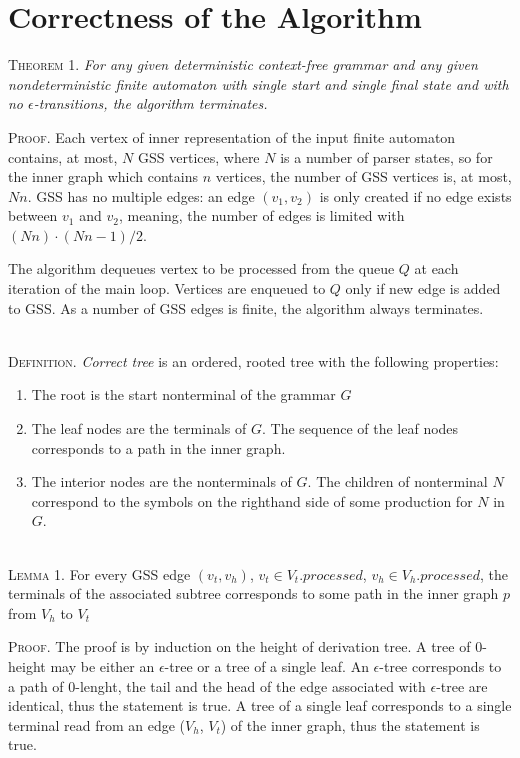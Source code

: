 \section{Correctness of the Algorithm}
\textsc{Theorem 1.}
\textit{For any given deterministic context-free grammar and any given nondeterministic
finite automaton with single start and single final state and with no $\epsilon$-transitions,
the algorithm terminates.}

\textsc{Proof.}
Each vertex of inner representation of the input finite automaton contains, at most, 
$N$ GSS vertices, where $N$ is a number of parser states, so for the inner graph which contains $n$
vertices, the number of GSS vertices is, at most, $Nn$. GSS has no multiple edges:
an edge $(v_{1}, v_{2})$ is only created if no edge exists between $v_{1}$ and $v_{2}$,  
meaning, the number of edges is limited with $(Nn) \cdot (Nn - 1) / 2 $. 

The algorithm dequeues vertex to be processed from the queue $Q$ at each iteration of the 
main loop. Vertices are enqueued to $Q$ only if new edge is added to GSS. As a number of 
GSS edges is finite, the algorithm always terminates. 

~\\
\textsc{Definition.} 
\emph{Correct tree} is an ordered, rooted tree with the following properties:
\begin{enumerate}
  \item The root is the start nonterminal of the grammar $G$
  \item The leaf nodes are the terminals of $G$. The sequence of the leaf nodes 
        corresponds to a path in the inner graph. 
  \item The interior nodes are the nonterminals of $G$. The children of nonterminal 
        $N$ correspond to the symbols on the righthand side of some production for $N$ in $G$.
\end{enumerate}

~\\
\textsc{Lemma 1.}
For every GSS edge $(v_{t}, v_{h})$, $v_{t} \in V_{t}.processed$, $v_{h} \in V_{h}.processed$, 
the terminals of the associated subtree corresponds to some path in the inner graph $p$ from $V_{h}$ to $V_{t}$

\textsc{Proof.}
The proof is by induction on the height of derivation tree. 
A tree of 0-height may be either an $\epsilon$-tree or a tree of a single leaf.
An $\epsilon$-tree corresponds to a path of 0-lenght, the tail and the head of the edge associated with 
$\epsilon$-tree are identical, thus the statement is true. A tree of a single leaf corresponds to a single 
terminal read from an edge ($V_{h}$, $V_{t}$) of the inner graph, thus the statement is true.

